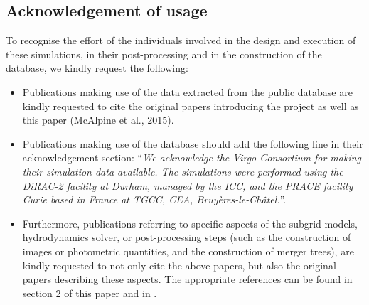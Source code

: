 \subsection{Acknowledgement of usage}
To recognise the effort of the individuals involved in the design and execution
of these simulations, in their post-processing and in the construction of the
database, we kindly request the following:
\begin{itemize}

\item Publications making use of the \eagle data extracted from the public
  database are kindly requested to cite the original papers introducing the project
  \citep{Schaye2015,Crain2015} as well as this paper (McAlpine et al., 2015).

\item Publications making use of the database should add the following line in
  their acknowledgement section: ``\textit{We acknowledge the Virgo Consortium
    for making their simulation data available. The \eagle simulations were
    performed using the DiRAC-2 facility at Durham, managed by the ICC, and the
    PRACE facility Curie based in France at TGCC, CEA, Bruy\`eres-le-Ch\^atel.}''.

\item Furthermore, publications referring to specific aspects of the subgrid
  models, hydrodynamics solver, or post-processing steps (such as the
  construction of images or photometric quantities, and the construction of
  merger trees), are kindly requested to not only cite the above papers, but
  also the original papers describing these aspects. The appropriate references
  can be found in section 2 of this paper and in \cite{Schaye2015}.

\end{itemize}

